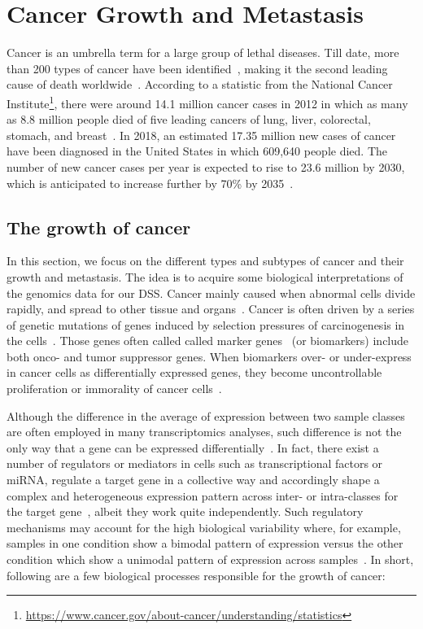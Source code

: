 \section{Cancer Growth and Metastasis}
\label{cancer_growth}
Cancer is an umbrella term for a large group of lethal diseases. Till date, more than 200 types of cancer have been identified~\cite{82Tomczak}, making it the second leading cause of death worldwide~\cite{pancan}. According to a statistic from the National Cancer Institute\footnote{\url{https://www.cancer.gov/about-cancer/understanding/statistics}}, there were around 14.1 million cancer cases in 2012 in which as many as 8.8 million people died of five leading cancers of lung, liver, colorectal, stomach, and breast~\cite{stat}. In 2018, an estimated 17.35 million new cases of cancer have been diagnosed in the United States in which 609,640 people died. The number of new cancer cases per year is expected to rise to 23.6 million by 2030, which is anticipated to increase further by 70\% by 2035~\cite{71Torre}. 

\subsection{The growth of cancer}
In this section, we focus on the different types and subtypes of cancer and their growth and metastasis. The idea is to acquire some biological interpretations of the genomics data for our DSS. Cancer mainly caused when abnormal cells divide rapidly, and spread to other tissue and organs~\cite{pancan}. Cancer is often  driven by a series of genetic mutations of genes induced by selection pressures of carcinogenesis in the cells~\cite{ghazani2017assigning, baker2015cancer}. Those genes often called called marker genes ~(or biomarkers) include both onco- and tumor suppressor genes. When biomarkers over- or under-express in cancer cells as differentially expressed genes, they become uncontrollable proliferation or immorality of cancer cells~\cite{ghazani2017assigning, baker2015cancer}. 

\hspace*{3.5mm} Although the difference in the average of expression between two sample classes are often employed in many transcriptomics analyses, such difference is not the only way that a gene can be expressed differentially~\cite{xie2018adaptively}. In fact, there exist a number of regulators or mediators in cells such as transcriptional factors or miRNA, regulate a target gene in a collective way and accordingly shape a complex and heterogeneous expression pattern across inter- or intra-classes for the target gene~\cite{ghazani2017assigning, baker2015cancer}, albeit they work quite independently. Such regulatory mechanisms may account for the high biological variability where, for example, samples in one condition show a bimodal pattern of expression versus the other condition which show a unimodal pattern of expression across samples~\cite{xie2018adaptively}. In short, following are a few biological processes responsible for the growth of cancer: 

